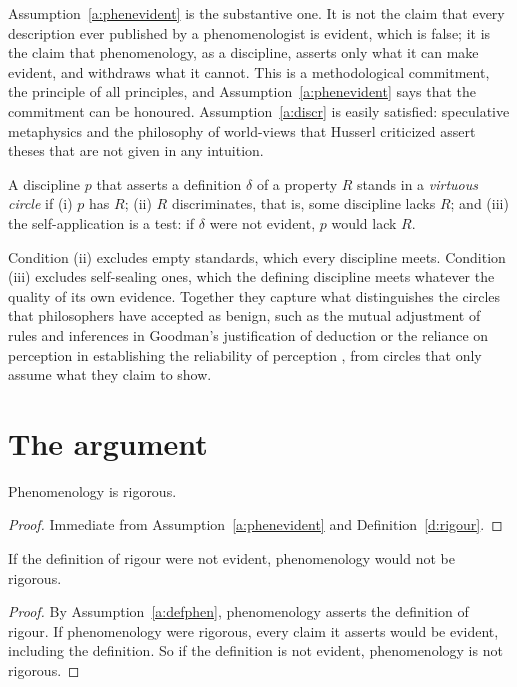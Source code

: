 \documentclass{situationist-preprint}
\begin{document}
Assumption~\ref{a:phenevident} is the substantive one. It is not the claim that every description ever published by a phenomenologist is evident, which is false; it is the claim that phenomenology, as a discipline, asserts only what it can make evident, and withdraws what it cannot. This is a methodological commitment, the principle of all principles, and Assumption~\ref{a:phenevident} says that the commitment can be honoured. Assumption~\ref{a:discr} is easily satisfied: speculative metaphysics and the philosophy of world-views that Husserl criticized assert theses that are not given in any intuition.

\begin{definition}\label{d:virtuous}
A discipline $p$ that asserts a definition $\delta$ of a property $R$ stands in a \emph{virtuous circle} if (i) $p$ has $R$; (ii) $R$ discriminates, that is, some discipline lacks $R$; and (iii) the self-application is a test: if $\delta$ were not evident, $p$ would lack $R$.
\end{definition}

Condition (ii) excludes empty standards, which every discipline meets. Condition (iii) excludes self-sealing ones, which the defining discipline meets whatever the quality of its own evidence. Together they capture what distinguishes the circles that philosophers have accepted as benign, such as the mutual adjustment of rules and inferences in Goodman's justification of deduction \citep[ch.~III]{Goodman1955} or the reliance on perception in establishing the reliability of perception \citep{Alston1986}, from circles that only assume what they claim to show.

\section{The argument}

\begin{theorem}\label{t:rigorous}
Phenomenology is rigorous.
\end{theorem}

\begin{proof}
Immediate from Assumption~\ref{a:phenevident} and Definition~\ref{d:rigour}.
\end{proof}

\begin{lemma}\label{l:test}
If the definition of rigour were not evident, phenomenology would not be rigorous.
\end{lemma}

\begin{proof}
By Assumption~\ref{a:defphen}, phenomenology asserts the definition of rigour. If phenomenology were rigorous, every claim it asserts would be evident, including the definition. So if the definition is not evident, phenomenology is not rigorous.
\end{proof}
\end{document}
